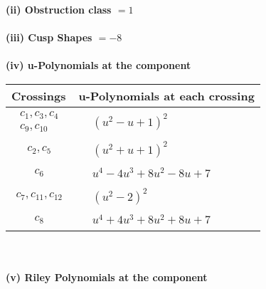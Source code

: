 \documentclass[1p]{elsarticle_modified}
\theoremstyle{definition}
\begin{document}
\flushleft \textbf{(ii) Obstruction class $= 1$}\\~\\
\flushleft \textbf{(iii) Cusp Shapes $= -8$}\\~\\
\newpage\renewcommand{\arraystretch}{1}
\flushleft \textbf{(iv) u-Polynomials at the component}\newline \\
\begin{tabular}{m{50pt}|m{274pt}}
Crossings & \hspace{64pt}u-Polynomials at each crossing \\
\hline $$\begin{aligned}c_{1},c_{3},c_{4}\\c_{9},c_{10}\end{aligned}$$&$\begin{aligned}
&(u^2- u+1)^2
\end{aligned}$\\
\hline $$\begin{aligned}c_{2},c_{5}\end{aligned}$$&$\begin{aligned}
&(u^2+u+1)^2
\end{aligned}$\\
\hline $$\begin{aligned}c_{6}\end{aligned}$$&$\begin{aligned}
&u^4-4 u^3+8 u^2-8 u+7
\end{aligned}$\\
\hline $$\begin{aligned}c_{7},c_{11},c_{12}\end{aligned}$$&$\begin{aligned}
&(u^2-2)^2
\end{aligned}$\\
\hline $$\begin{aligned}c_{8}\end{aligned}$$&$\begin{aligned}
&u^4+4 u^3+8 u^2+8 u+7
\end{aligned}$\\
\hline
\end{tabular}\\~\\
\newpage\renewcommand{\arraystretch}{1}
\flushleft \textbf{(v) Riley Polynomials at the component}\newline \\
\end{document}
